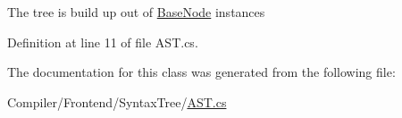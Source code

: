 The tree is build up out of \hyperlink{class_c_p_u___o_s___simulator_1_1_compiler_1_1_frontend_1_1_syntax_tree_1_1_base_node}{Base\+Node} instances 



Definition at line 11 of file A\+S\+T.\+cs.



The documentation for this class was generated from the following file\+:\begin{DoxyCompactItemize}
\item 
Compiler/\+Frontend/\+Syntax\+Tree/\hyperlink{_a_s_t_8cs}{A\+S\+T.\+cs}\end{DoxyCompactItemize}
